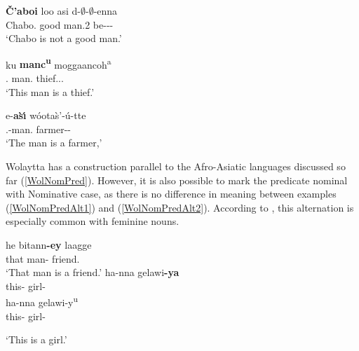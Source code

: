 
\begin{exe}\ex\label{GamNomPred}
\gll \textbf{\v{C}'aboi} lo\textglotstop o asi d-$\emptyset$-$\emptyset$-enna\\
Chabo.\nom{} good man.\acc{}2 be-\persm-\tns{}-\Neg{}\\
\glt `Chabo is not a good man.'
\end{exe}  

\begin{exe}\ex\label{KabNomPred}
\gll ku \textbf{manc\textsuperscript{u}} moggaancoh\textsuperscript{a}\\
\dist{}.\mas{} man.\nom{} thief.\acc{}.\cop{}.\mas{}\\
\glt `This man is a thief.'%
\end{exe}

\begin{exe}\ex\label{ZayNomPred}
\gll \textglotstop e-\textbf{\textglotstop a\`s{\'\i}} w\'oota\`s'-\'u-tte\\
\deter{}.\mas{}-man.\nom{} farmer-\epen{}-\cop{}\\
\glt `The man is a farmer,'
\end{exe} 

Wolaytta has a construction parallel to the Afro-Asiatic languages discussed so far (\ref{WolNomPred}). 
However, it is also possible to mark the predicate nominal with Nominative case, as there is no difference in meaning between examples (\ref{WolNomPredAlt1}) and (\ref{WolNomPredAlt2}). 
According to \citet{Lamberti:1997}, this alternation is especially common with feminine nouns.

\begin{exe}\ex{}
\begin{xlist}
\ex\label{WolNomPred}
\gll he bitann\textbf{-ey} laagge\\
that man-\nom{} friend.\acc{}\\
\glt `That man is a friend.'
\ex\label{WolNomPredAlt1}\gll ha-nna gelawi\textbf{-ya}\\
this-\fem{} girl-\nom{}\\
\ex\label{WolNomPredAlt2}\gll ha-nna gelawi-y\textsuperscript{u}\\
this-\fem{} girl-\acc{}\\
\end{xlist}
\glt `This is a girl.'
\end{exe}

